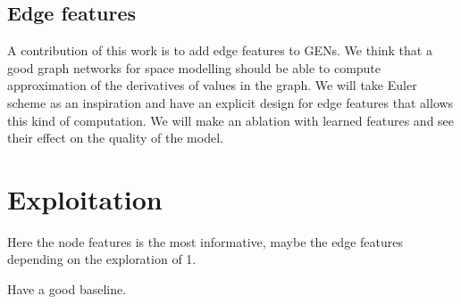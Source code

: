 \documentclass[a4paper,10pt]{article}
\newcommand{\ap}[1]{\marginpar{{\tiny \color{red} [AP] #1}}}
\begin{document}
\subsection{Edge features}
A contribution of this work is to add edge features to GENs. We think that a good graph networks for space modelling should be able to compute approximation of the derivatives of values in the graph. We will take Euler scheme as an inspiration and have an explicit design for edge features that allows this kind of computation. We will make an ablation with learned features and see their effect on the quality of the model.
\ap{TODO: sketch}



\section{Exploitation}


Here the node features is the most informative, maybe the edge features depending on the exploration of 1.


Have a good baseline.


\end{document}
